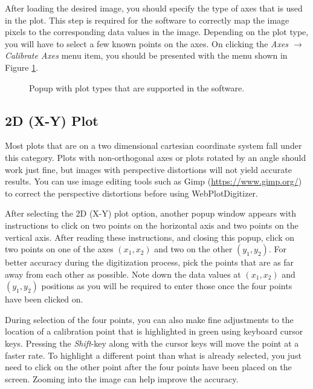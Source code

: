 \documentclass[letterpaper, 11pt]{article}
\begin{document}
After loading the desired image, you should specify the type of axes that is used in the plot. This step is required for the software to correctly map the image pixels to the corresponding data values in the image. Depending on the plot type, you will have to select a few known points on the axes. On clicking the \emph{Axes $\rightarrow$ Calibrate Axes} menu item, you should be presented with the menu shown in Figure \ref{fig:defineAxesPopup}.
\begin{figure}
\begin{center}
\caption{Popup with plot types that are supported in the software.}
\label{fig:defineAxesPopup}
\end{center}
\end{figure}

\subsection{2D (X-Y) Plot}
Most plots that are on a two dimensional cartesian coordinate system fall under this category. Plots with non-orthogonal axes or plots rotated by an angle should work just fine, but images with perspective distortions will not yield accurate results. You can use image editing tools such as Gimp (\url{https://www.gimp.org/}) to correct the perspective distortions before using WebPlotDigitizer.

After selecting the 2D (X-Y) plot option, another popup window appears with instructions to click on two points on the horizontal axis and two points on the vertical axis. After reading these instructions, and closing this popup, click on two points on one of the axes $(x_1, x_2)$ and two on the other $(y_1, y_2)$. For better accuracy during the digitization process, pick the points that are as far away from each other as possible. Note down the data values at $(x_1, x_2)$ and $(y_1, y_2)$ positions as you will be required to enter those once the four points have been clicked on.

During selection of the four points, you can also make fine adjustments to the location of a calibration point that is highlighted in green using keyboard cursor keys. Pressing the \emph{Shift}-key along with the cursor keys will move the point at a faster rate. To highlight a different point than what is already selected, you just need to click on the other point after the four points have been placed on the screen. Zooming into the image can help improve the accuracy.
\end{document}
